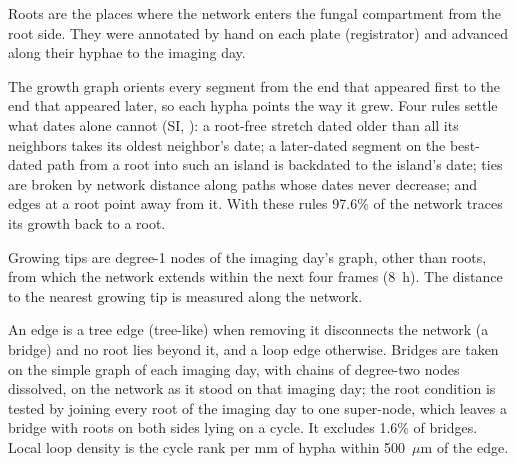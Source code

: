Roots are the places where the network enters the fungal compartment from the root side.
They were annotated by hand on each plate (registrator) and advanced along their hyphae to the imaging day.

The growth graph orients every segment from the end that appeared first to the end that appeared later, so each hypha points the way it grew.
Four rules settle what dates alone cannot (SI, ): a root-free stretch dated older than all its neighbors takes its oldest neighbor's date; a later-dated segment on the best-dated path from a root into such an island is backdated to the island's date; ties are broken by network distance along paths whose dates never decrease; and edges at a root point away from it.
With these rules 97.6\% of the network traces its growth back to a root.

Growing tips are degree-1 nodes of the imaging day's graph, other than roots, from which the network extends within the next four frames (8~h).
The distance to the nearest growing tip is measured along the network.

An edge is a tree edge (tree-like) when removing it disconnects the network (a bridge) and no root lies beyond it, and a loop edge otherwise.
Bridges are taken on the simple graph of each imaging day, with chains of degree-two nodes dissolved, on the network as it stood on that imaging day; the root condition is tested by joining every root of the imaging day to one super-node, which leaves a bridge with roots on both sides lying on a cycle.
It excludes 1.6\% of bridges.
Local loop density is the cycle rank per mm of hypha within 500~$\mu$m of the edge.


